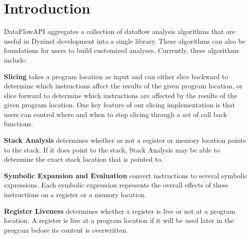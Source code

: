 \section{Introduction}
\label{sec:intro}

DataFlowAPI aggregates a collection of dataflow analysis algorithms that are
useful in Dyninst development into a single library. These algorithms can also
be foundations for users to build customized analyses. Currently, these algorithms include:

\begin{itemize}[leftmargin=0pt,label=$\circ$]

{\item \textbf{Slicing}
takes a program location as input and can either slice
backward to determine which instructions affect the results of the given program location, or
slice forward to determine which instructions are affected by the results of the
given program location. One key feature of our slicing implementation is that
users can control where and when to stop slicing through a set of call back
functions.
}

{\item \textbf{Stack Analysis}
determines whether or not a register or memory location points to the stack.  If it does point to the stack, Stack Analysis may be able to determine the exact stack location that is pointed to.
}

{\item \textbf{Symbolic Expansion and Evaluation}
convert instructions to
several symbolic expressions. Each symbolic expression represents the overall effects of
these instructions on a register or a memory location.
}

{\item \textbf{Register Liveness}
determines whether a register is live or not at a program
location. A register is live at a program location if it will be used later in the program before its
content is overwritten.
}
\end{itemize}
